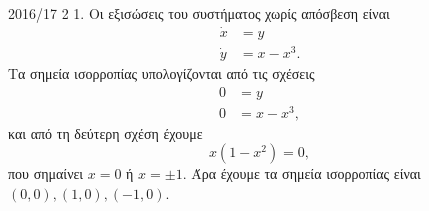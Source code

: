 \begin{solution}{2016/17 2}
    1. Οι εξισώσεις του συστήματος χωρίς απόσβεση είναι
    \begin{align*}
        \dot{x} &= y \\
        \dot{y} &= x - x^3.
    \end{align*}
    Τα σημεία ισορροπίας υπολογίζονται από τις σχέσεις
    \begin{align*}
        0 &= y \\
        0 &= x - x^3,
    \end{align*}
    και από τη δεύτερη σχέση έχουμε
    \begin{equation*}
        x(1 - x^2) = 0,
    \end{equation*}
    που σημαίνει \( x = 0 \) ή \( x = \pm 1 \). Άρα έχουμε τα σημεία
    ισορροπίας είναι \( (0, 0), (1, 0), (-1, 0) \).


\end{solution}
